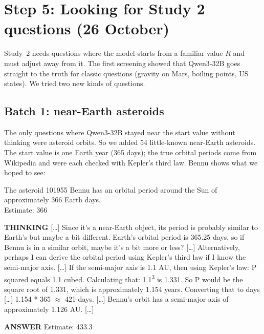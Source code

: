 \documentclass[11pt,a4paper]{article}
\newcommand{\who}[1]{\par\smallskip\noindent\textsf{\textbf{\footnotesize\MakeUppercase{#1}}}\quad}
\newcommand{\cut}{\textup{[\dots]}}
\begin{document}
\section{Step 5: Looking for Study 2 questions (26 October)}
\label{sec:s2search}

Study~2 needs questions where the model starts from a familiar value $R$ and must adjust away from it. The first screening showed that Qwen3-32B goes straight to the truth for classic questions (gravity on Mars, boiling points, US states). We tried two new kinds of questions.

\subsection{Batch 1: near-Earth asteroids}

The only questions where Qwen3-32B stayed near the start value without thinking were asteroid orbits. So we added 54 little-known near-Earth asteroids. The start value is one Earth year (365 days); the true orbital periods come from Wikipedia and were each checked with Kepler's third law. Bennu shows what we hoped to see:

\begin{transcript}
The asteroid 101955 Bennu has an orbital period around the Sun of approximately 366 Earth days.\\ Estimate: 366
\end{transcript}

\begin{transcript}
\who{Thinking} \cut{} Since it's a near-Earth object, its period is probably similar to Earth's but maybe a bit different. Earth's orbital period is 365.25 days, so if Bennu is in a similar orbit, maybe it's a bit more or less? \cut{} Alternatively, perhaps I can derive the orbital period using Kepler's third law if I know the semi-major axis. \cut{} If the semi-major axis is 1.1 AU, then using Kepler's law: P squared equals 1.1 cubed. Calculating that: 1.1\textsuperscript{3} is 1.331. So P would be the square root of 1.331, which is approximately 1.154 years. Converting that to days \cut{} 1.154 * 365 $\approx$ 421 days. \cut{} Bennu's orbit has a semi-major axis of approximately 1.126 AU. \cut{}
\who{Answer} Estimate: 433.3
\end{transcript}
\end{document}
